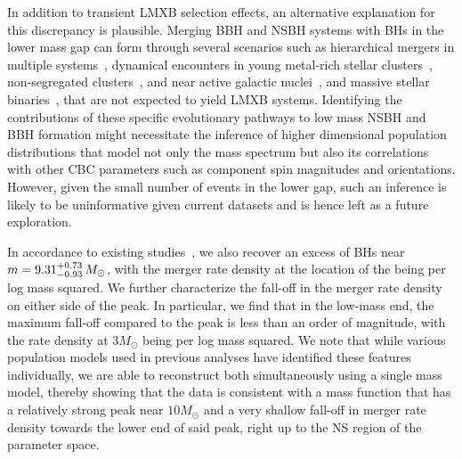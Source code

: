 \documentclass[modern]{aastex631}
\begin{document}
In addition to transient LMXB selection effects, an alternative explanation for this discrepancy is plausible. Merging BBH and NSBH systems with BHs in the lower mass gap can form through several scenarios such as hierarchical mergers in multiple systems~\citep{Lu:2020gfh, Liu:2020gif}, dynamical encounters in young metal-rich stellar clusters~\citep{ArcaSedda:2021zmm}, non-segregated clusters~\citep{Clausen:2014ksa, Fragione:2020wac, Rastello:2020sru}, and near active galactic nuclei~\citep{McKernan:2020lgr, Yang:2020xyi}, and massive stellar binaries~\citep{Antoniadis:2021dhe}, that are not expected to yield LMXB systems. Identifying the contributions of these specific evolutionary pathways to low mass NSBH and BBH formation might necessitate the inference of higher dimensional population distributions that model not only the mass spectrum but also its correlations with other CBC parameters such as component spin magnitudes and orientations. However, given the small number of events in the lower gap, such an inference is likely to be uninformative given current datasets and is hence left as a future exploration.

In accordance to existing studies~\citep[e.g.,][]{KAGRA:2021duu, LIGOScientific:2024elc}, we also recover an excess
of BHs near $m=9.31^{+0.73}_{-0.93} \, M_\odot$, with the merger rate density at the location of the being \dNlogmpeakincludingnewunits per log mass squared. We further characterize the fall-off in the merger rate density on either side of the peak. In particular, we find that in the low-mass end, the maximum fall-off compared to the peak is less than an order of magnitude, with the rate density at $3M_{\odot}$ being \dNlogmmlowincludingnewunits per log mass squared. We note that while various population models used in previous analyses have identified these features individually,  we are able to reconstruct both simultaneously using a single mass model, thereby showing that the data is consistent with a mass function that has a relatively strong peak near $10M_{\odot}$ and a very shallow fall-off in merger rate density towards the lower end of said peak, right up to the NS region of the parameter space.
\end{document}
